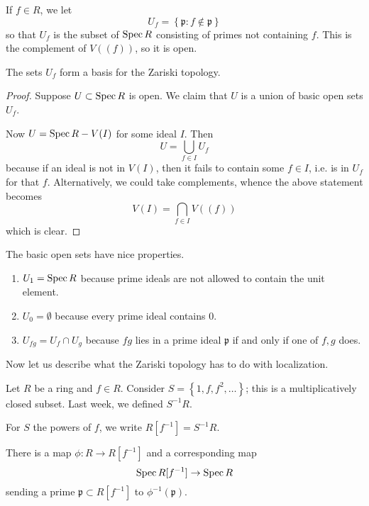 \begin{definition} 
If $f \in R$, we let 
\[ U_f = \left\{\mathfrak{p}: f \notin \mathfrak{p}\right\}  \]
so that $U_f$ is the subset of $\operatorname{Spec} R$ consisting of primes
not containing
$f$. This is the complement of $V((f))$, so it is open.  
\end{definition} 

\begin{proposition} 
The sets $U_f$ form a basis for the Zariski topology. 
\end{proposition} 

\begin{proof} 
Suppose $U \subset \operatorname{Spec} R$ is open. We claim that $U$ is a
union of basic
open sets $U_f$. 

Now $U = \operatorname{Spec} R - V(I)$ for some ideal $I$.  Then
\[ U = \bigcup_{f \in I} U_f  \]
because if an ideal is not in $V(I)$, then it fails to contain
some $f \in I$,
i.e. is in $U_f$ for that $f$. Alternatively, we could take
complements, whence
the above statement becomes
\[ V(I) = \bigcap_{f \in I} V((f))  \]
which is clear.
\end{proof} 

The basic open sets have nice properties.
\begin{enumerate}
\item $U_1 = \operatorname{Spec} R$ because prime ideals are not allowed to
contain the
unit element. 
\item $U_0 = \emptyset$ because every prime ideal contains $0$.
\item $U_{fg} = U_f \cap U_g$ because $fg$ lies in a prime ideal
$\mathfrak{p}$ if and only if one of $f,g$ does.
\end{enumerate}

Now let us describe what the Zariski topology has to do with
localization.

\begin{example} 
Let $R$ be a ring and $f \in R$. Consider $S = \left\{1, f, f^2,
\dots
\right\}$; this is a multiplicatively closed subset. Last week,
we defined
$S^{-1}R$.
\end{example}

\begin{definition} 
For $S$ the powers of $f$, we write $R[f^{-1}]=S^{-1}R$. 
\end{definition} 

There is  a map $\phi: R \to R[f^{-1}]$ and a corresponding map
\[ \operatorname{Spec} R[f^{-1}] \to \operatorname{Spec} R  \]
sending a prime $\mathfrak{p} \subset R[f^{-1}]$ to
$\phi^{-1}(\mathfrak{p})$.

